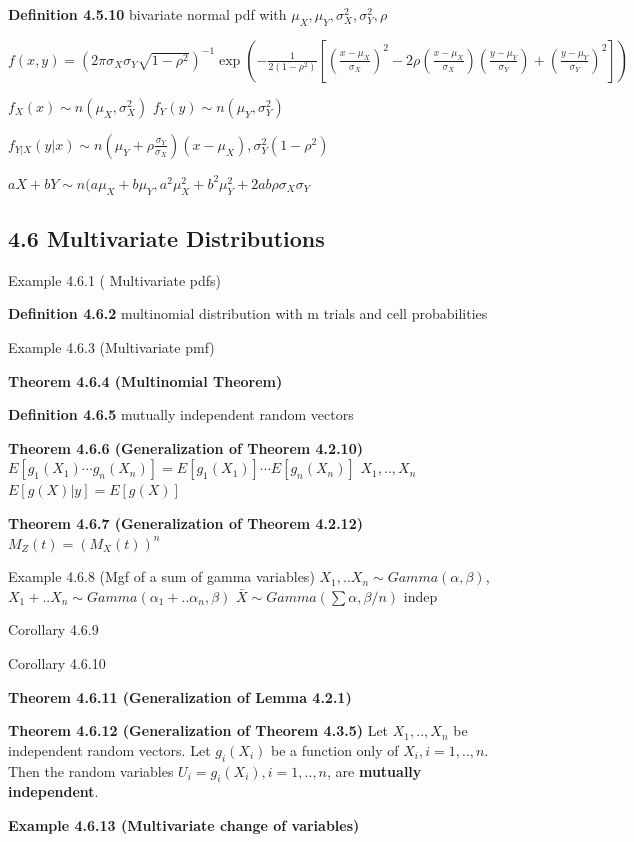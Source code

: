 \documentclass[10pt,twocolumn,portrait]{article}
\begin{document}
\textbf{Definition 4.5.10} bivariate normal pdf with
\(\mu_X,\mu_Y,\sigma_X^2,\sigma_Y^2, \rho\)

\(f(x,y)=(2\pi\sigma_X\sigma_Y\sqrt{1-\rho^2})^{-1}\exp(-\frac{1}{2(1-\rho^2)}[(\frac{x-\mu_X}{\sigma_X})^2-2\rho(\frac{x-\mu_X}{\sigma_X})(\frac{y-\mu_Y}{\sigma_Y})+(\frac{y-\mu_Y}{\sigma_Y})^2])\)

\(f_X(x)\sim n(\mu_X,\sigma^2_X)\) \(f_Y(y)\sim n(\mu_Y,\sigma^2_Y)\)

\(f_{Y|X}(y|x) \sim n(\mu_Y+\rho\frac{\sigma_Y}{\sigma_X})(x-\mu_X),\sigma_Y^2(1-\rho^2)\)

\(aX+bY\sim n(a\mu_X+b\mu_Y,a^2\mu_X^2+b^2\mu_Y^2+2ab\rho\sigma_X\sigma_Y\)

\hypertarget{multivariate-distributions}{%
\subsection{4.6 Multivariate
Distributions}\label{multivariate-distributions}}

Example 4.6.1 ( Multivariate pdfs)

\textbf{Definition 4.6.2} multinomial distribution with m trials and
cell probabilities

Example 4.6.3 (Multivariate pmf)

\textbf{Theorem 4.6.4 (Multinomial Theorem)}

\textbf{Definition 4.6.5} mutually independent random vectors

\textbf{Theorem 4.6.6 (Generalization of Theorem 4.2.10)}
\(E[g_1(X_1)\cdots g_n(X_n)]=E[g_1(X_1)]\cdots E[g_n(X_n)]\)
\(X_1,.., X_n\) \(E[g(X)|y]=E[g(X)]\)

\textbf{Theorem 4.6.7 (Generalization of Theorem 4.2.12)}
\(M_Z(t)=(M_X(t))^n\)

Example 4.6.8 (Mgf of a sum of gamma variables)
\(X_1,..X_n\sim Gamma(\alpha,\beta)\),
\(X_1+..X_n\sim Gamma(\alpha_1+..\alpha_n,\beta)\)
\(\bar X\sim Gamma(\sum\alpha,\beta/n)\) indep

Corollary 4.6.9

Corollary 4.6.10

\textbf{Theorem 4.6.11 (Generalization of Lemma 4.2.1)}

\textbf{Theorem 4.6.12 (Generalization of Theorem 4.3.5)} Let
\(X_1,.., X_n\) be independent random vectors. Let \(g_i(X_i)\) be a
function only of \(X_i,i=1,..,n\). Then the random variables
\(U_i=g_i(X_i),i=1,..,n\), are \textbf{mutually independent}.

\textbf{Example 4.6.13 (Multivariate change of variables)}
\end{document}
